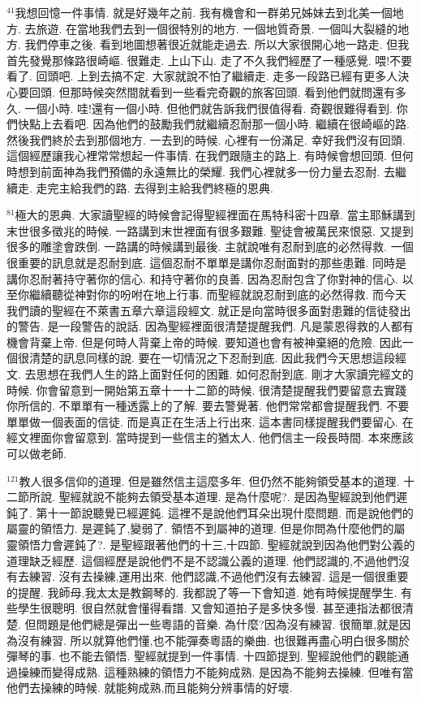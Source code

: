 \documentclass{book}
\begin{document}
$^{41}$我想回憶一件事情.
就是好幾年之前.
我有機會和一群弟兄姊妹去到北美一個地方.
去旅遊.
在當地我們去到一個很特別的地方.
一個地質奇景.
一個叫大裂縫的地方.
我們停車之後.
看到地圖想著很近就能走過去.
所以大家很開心地一路走.
但我首先發覺那條路很崎嶇.
很難走.
上山下山.
走了不久我們經歷了一種感覺.
喂!不要看了.
回頭吧.
上到去搞不定.
大家就說不怕了繼續走.
走多一段路已經有更多人決心要回頭.
但那時候突然間就看到一些看完奇觀的旅客回頭.
看到他們就問還有多久.
一個小時.
哇!還有一個小時.
但他們就告訴我們很值得看.
奇觀很難得看到.
你們快點上去看吧.
因為他們的鼓勵我們就繼續忍耐那一個小時.
繼續在很崎嶇的路.
然後我們終於去到那個地方.
一去到的時候.
心裡有一份滿足.
幸好我們沒有回頭.
這個經歷讓我心裡常常想起一件事情.
在我們跟隨主的路上.
有時候會想回頭.
但何時想到前面神為我們預備的永遠無比的榮耀.
我們心裡就多一份力量去忍耐.
去繼續走.
走完主給我們的路.
去得到主給我們終極的恩典.

$^{81}$極大的恩典.
大家讀聖經的時候會記得聖經裡面在馬特科密十四章.
當主耶穌講到末世很多徵兆的時候.
一路講到末世裡面有很多艱難.
聖徒會被萬民來恨惡.
又提到很多的雕塗會跌倒.
一路講的時候講到最後.
主就說唯有忍耐到底的必然得救.
一個很重要的訊息就是忍耐到底.
這個忍耐不單單是講你忍耐面對的那些患難.
同時是講你忍耐著持守著你的信心.
和持守著你的良善.
因為忍耐包含了你對神的信心.
以至你繼續聽從神對你的吩咐在地上行事.
而聖經就說忍耐到底的必然得救.
而今天我們讀的聖經在不萊書五章六章這段經文.
就正是向當時很多面對患難的信徒發出的警告.
是一段警告的說話.
因為聖經裡面很清楚提醒我們.
凡是蒙恩得救的人都有機會背棄上帝.
但是何時人背棄上帝的時候.
要知道也會有被神棄絕的危險.
因此一個很清楚的訊息同樣的說.
要在一切情況之下忍耐到底.
因此我們今天思想這段經文.
去思想在我們人生的路上面對任何的困難.
如何忍耐到底.
剛才大家讀完經文的時候.
你會留意到一開始第五章十一十二節的時候.
很清楚提醒我們要留意去實踐你所信的.
不單單有一種透露上的了解.
要去警覺著.
他們常常都會提醒我們.
不要單單做一個表面的信徒.
而是真正在生活上行出來.
這本書同樣提醒我們要留心.
在經文裡面你會留意到.
當時提到一些信主的猶太人.
他們信主一段長時間.
本來應該可以做老師.

$^{121}$教人很多信仰的道理.
但是雖然信主這麼多年.
但仍然不能夠領受基本的道理.
十二節所說.
聖經就說不能夠去領受基本道理.
是為什麼呢?.
是因為聖經說到他們遲鈍了.
第十一節說聽覺已經遲鈍.
這裡不是說他們耳朵出現什麼問題.
而是說他們的屬靈的領悟力.
是遲鈍了,變弱了.
領悟不到屬神的道理.
但是你問為什麼他們的屬靈領悟力會遲鈍了?.
是聖經跟著他們的十三,十四節.
聖經就說到因為他們對公義的道理缺乏經歷.
這個經歷是說他們不是不認識公義的道理.
他們認識的,不過他們沒有去練習.
沒有去操練,運用出來.
他們認識,不過他們沒有去練習.
這是一個很重要的提醒.
我師母,我太太是教鋼琴的.
我都說了等一下會知道.
她有時候提醒學生.
有些學生很聰明.
很自然就會懂得看譜.
又會知道拍子是多快多慢.
甚至連指法都很清楚.
但問題是他們總是彈出一些粵語的音樂.
為什麼?因為沒有練習.
很簡單,就是因為沒有練習.
所以就算他們懂,也不能彈奏粵語的樂曲.
也很難再盡心明白很多關於彈琴的事.
也不能去領悟.
聖經就提到一件事情.
十四節提到.
聖經說他們的觀能通過操練而變得成熟.
這種熟練的領悟力不能夠成熟.
是因為不能夠去操練.
但唯有當他們去操練的時候.
就能夠成熟,而且能夠分辨事情的好壞.
\end{document}
